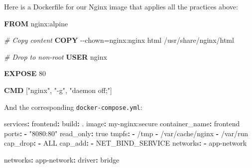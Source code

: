 \documentclass[11pt,american,a4paper,]{book}
\newenvironment{Shaded}{}{}
\newcommand{\AttributeTok}[1]{\textcolor[rgb]{0.49,0.56,0.16}{#1}}
\newcommand{\CharTok}[1]{\textcolor[rgb]{0.25,0.44,0.63}{#1}}
\newcommand{\CommentTok}[1]{\textcolor[rgb]{0.38,0.63,0.69}{\textit{#1}}}
\newcommand{\FunctionTok}[1]{\textcolor[rgb]{0.02,0.16,0.49}{#1}}
\newcommand{\KeywordTok}[1]{\textcolor[rgb]{0.00,0.44,0.13}{\textbf{#1}}}
\newcommand{\NormalTok}[1]{#1}
\newcommand{\OperatorTok}[1]{\textcolor[rgb]{0.40,0.40,0.40}{#1}}
\newcommand{\StringTok}[1]{\textcolor[rgb]{0.25,0.44,0.63}{#1}}
\begin{document}
Here is a Dockerfile for our Nginx image that applies all the practices
above:

\begin{Shaded}
\begin{Highlighting}[]
\KeywordTok{FROM}\NormalTok{ nginx:alpine}

\CommentTok{\# Copy content}
\KeywordTok{COPY} \OperatorTok{{-}{-}chown=nginx:nginx}\NormalTok{ html /usr/share/nginx/html}

\CommentTok{\# Drop to non{-}root}
\KeywordTok{USER}\NormalTok{ nginx}

\KeywordTok{EXPOSE}\NormalTok{ 80}

\KeywordTok{CMD}\NormalTok{ [}\StringTok{"nginx"}\NormalTok{, }\StringTok{"{-}g"}\NormalTok{, }\StringTok{"daemon off;"}\NormalTok{]}
\end{Highlighting}
\end{Shaded}

And the corresponding \texttt{docker-compose.yml}:

\begin{Shaded}
\begin{Highlighting}[]
\FunctionTok{services}\KeywordTok{:}
\AttributeTok{  }\FunctionTok{frontend}\KeywordTok{:}
\AttributeTok{    }\FunctionTok{build}\KeywordTok{:}\AttributeTok{ .}
\AttributeTok{    }\FunctionTok{image}\KeywordTok{:}\AttributeTok{ my{-}nginx:secure}
\AttributeTok{    }\FunctionTok{container\_name}\KeywordTok{:}\AttributeTok{ frontend}
\AttributeTok{    }\FunctionTok{ports}\KeywordTok{:}
\AttributeTok{      }\KeywordTok{{-}}\AttributeTok{ }\StringTok{"8080:80"}
\AttributeTok{    }\FunctionTok{read\_only}\KeywordTok{:}\AttributeTok{ }\CharTok{true}
\AttributeTok{    }\FunctionTok{tmpfs}\KeywordTok{:}
\AttributeTok{      }\KeywordTok{{-}}\AttributeTok{ /tmp}
\AttributeTok{      }\KeywordTok{{-}}\AttributeTok{ /var/cache/nginx}
\AttributeTok{      }\KeywordTok{{-}}\AttributeTok{ /var/run}
\AttributeTok{    }\FunctionTok{cap\_drop}\KeywordTok{:}
\AttributeTok{      }\KeywordTok{{-}}\AttributeTok{ ALL}
\AttributeTok{    }\FunctionTok{cap\_add}\KeywordTok{:}
\AttributeTok{      }\KeywordTok{{-}}\AttributeTok{ NET\_BIND\_SERVICE}
\AttributeTok{    }\FunctionTok{networks}\KeywordTok{:}
\AttributeTok{      }\KeywordTok{{-}}\AttributeTok{ app{-}network}

\FunctionTok{networks}\KeywordTok{:}
\AttributeTok{  }\FunctionTok{app{-}network}\KeywordTok{:}
\AttributeTok{    }\FunctionTok{driver}\KeywordTok{:}\AttributeTok{ bridge}
\end{Highlighting}
\end{Shaded}
\end{document}
